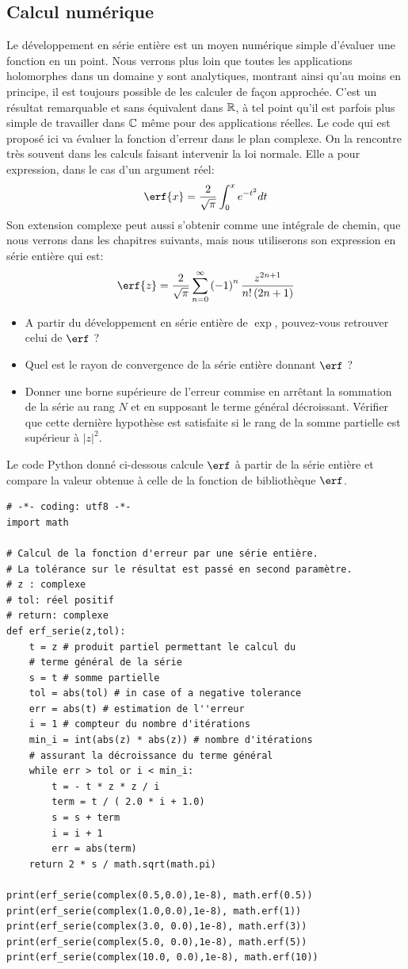 \subsection{Calcul numérique}
Le développement en série entière est un moyen numérique simple d'évaluer une fonction en un point. Nous verrons plus loin que toutes les applications
holomorphes dans un domaine y sont analytiques, montrant ainsi qu'au moins en principe, il est toujours possible de les calculer de façon approchée. C'est un résultat remarquable et sans équivalent dans $\mathbb{R}$, à tel point qu'il est parfois plus simple de travailler dans $\mathbb{C}$ même pour des applications réelles. Le code qui est proposé ici va évaluer la fonction d'erreur dans le plan complexe. On la rencontre très souvent dans les calculs faisant intervenir la loi normale. Elle a pour expression, dans le cas d'un argument réel:
\[
\erf{x} = \frac{2}{\sqrt{\pi}} \int_0^x e^{-t^2}dt
\]
Son extension complexe peut aussi s'obtenir comme une intégrale de chemin, que nous verrons dans les chapitres suivants, mais nous utiliserons son expression en série entière qui est:
\[
\erf{z} =  \frac{2}{\sqrt{\pi}} \sum_{n=0}^\infty \left(-1\right)^n \frac{z^{2n+1}}{n!\left(2n+1\right)}
\]
\begin{itemize}
\item A partir du développement en série entière de $\exp$, pouvez-vous retrouver celui de $\erf$ ?
\item Quel est le rayon de convergence de la série entière donnant $\erf$ ?
\item Donner une borne supérieure de l'erreur commise en arrêtant la sommation de la série au rang $N$ et en supposant
le terme général décroissant. Vérifier que cette dernière hypothèse est satisfaite si le rang de la somme partielle est supérieur à $|z|^2$.
\end{itemize}
Le code Python donné ci-dessous calcule $\erf$ à partir de la série entière et compare la valeur obtenue à celle de la fonction
de bibliothèque $\erf$.
\begin{verbatim}
# -*- coding: utf8 -*-
import math

# Calcul de la fonction d'erreur par une série entière. 
# La tolérance sur le résultat est passé en second paramètre.
# z : complexe
# tol: réel positif
# return: complexe
def erf_serie(z,tol):
    t = z # produit partiel permettant le calcul du 
    # terme général de la série
    s = t # somme partielle
    tol = abs(tol) # in case of a negative tolerance
    err = abs(t) # estimation de l''erreur
    i = 1 # compteur du nombre d'itérations
    min_i = int(abs(z) * abs(z)) # nombre d'itérations
    # assurant la décroissance du terme général
    while err > tol or i < min_i:
        t = - t * z * z / i
        term = t / ( 2.0 * i + 1.0)
        s = s + term
        i = i + 1 
        err = abs(term)
    return 2 * s / math.sqrt(math.pi)

print(erf_serie(complex(0.5,0.0),1e-8), math.erf(0.5))
print(erf_serie(complex(1.0,0.0),1e-8), math.erf(1))
print(erf_serie(complex(3.0, 0.0),1e-8), math.erf(3))
print(erf_serie(complex(5.0, 0.0),1e-8), math.erf(5))
print(erf_serie(complex(10.0, 0.0),1e-8), math.erf(10))
\end{verbatim} 

